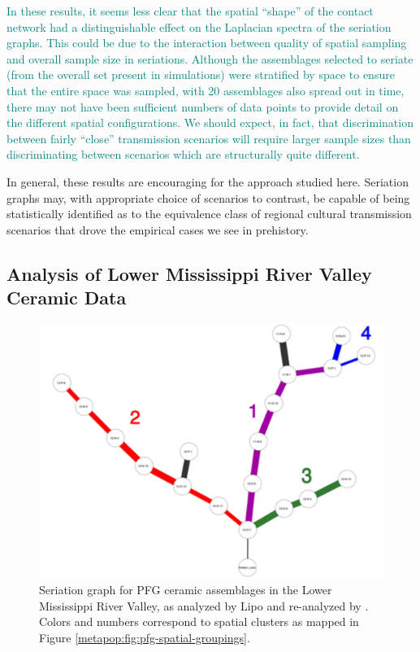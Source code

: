     \textcolor{teal}{In these results, it seems less clear that the spatial ``shape'' of the contact network had a distinguishable effect on the  Laplacian spectra of the seriation graphs.  This could be due to the interaction between quality of spatial sampling and overall sample size in seriations.  Although the assemblages selected to seriate (from the overall set present in simulations) were stratified by space to ensure that the entire space was sampled, with 20 assemblages also spread out in time, there may not have been sufficient numbers of data points to provide detail on the different spatial configurations.  We should expect, in fact, that discrimination between fairly ``close'' transmission scenarios will require larger sample sizes than discriminating between scenarios which are structurally quite different.  
    }
    
    In general, these results are encouraging for the approach studied here.  Seriation graphs may, with appropriate choice of scenarios to contrast, be capable of being statistically identified as to the equivalence class of regional cultural transmission scenarios that drove the empirical cases we see in prehistory. 
    
    \subsection{Analysis of Lower Mississippi River Valley Ceramic Data}\label{metapop:sec:results-lmv}
    
    \begin{figure}[ht]
    \centering
    \includegraphics[scale=0.5]{graphics/multipleseriation/pfg-seriation-graph-minmax.pdf}
    \caption{Seriation graph for PFG \citeyearpar{PFG1951} ceramic assemblages in 
    the Lower Mississippi River Valley, as analyzed by Lipo \citeyearpar{Lipo2001a} and re-analyzed by \citet{Lipo2015}. Colors and numbers correspond to spatial clusters as mapped in Figure \ref{metapop:fig:pfg-spatial-groupings}.}
    \label{metapop:fig:pfg-seriation-graphs}
    \end{figure}
    
